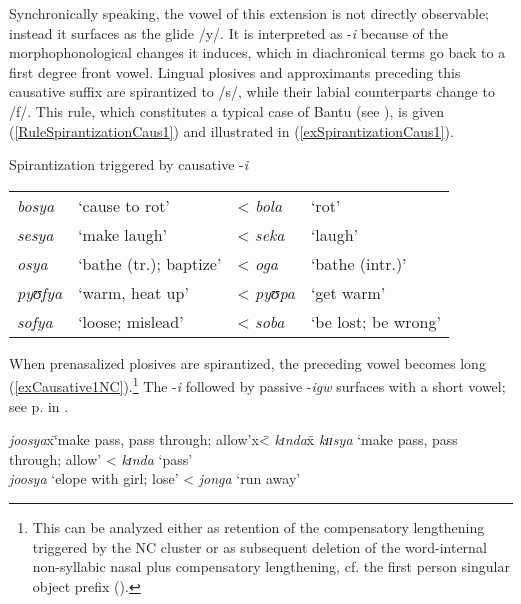 Synchronically speaking, the vowel of this extension is not directly observable; instead it surfaces as the glide /y/. It is interpreted as -\textit{i} because of the morphophonological changes it induces, which in diachronical terms go back to a first degree front vowel. Lingual plosives and approximants preceding this causative suffix are spirantized to /s/, while their labial counterparts change to /f/. This rule, which constitutes a typical case of Bantu  (see \citealt{BoestonK2008}), is given (\ref{RuleSpirantizationCaus1}) and illustrated in (\ref{exSpirantizationCaus1}).
\begin{exe}  
\ex Spirantization triggered by causative -\textit{i}\label{RuleSpirantizationCaus1}
\begin{xlist}
\ex {}
\ex {}
\end{xlist}
\ex\label{exSpirantizationCaus1} 
\begin{tabular}[t]{llll}
\textit{bosya}&`cause to rot'& < \textit{bola}&`rot'\\
\textit{sesya}&`make laugh'& < \textit{seka}&`laugh'\\
\textit{osya}&\lq bathe (tr.); baptize'& < \textit{oga}&`bathe (intr.)'\\
\textit{pyʊfya}&`warm, heat up'& < \textit{pyʊpa}&`get warm'\\
\textit{sofya}&`loose; mislead'& < \textit{soba}&`be lost; be wrong'
\end{tabular}
\end{exe}

\largerpage %
When prenasalized plosives are spirantized, the preceding vowel becomes long (\ref{exCausative1NC}).\footnote{This can be analyzed either as retention of the compensatory lengthening triggered by the NC cluster or as subsequent deletion of the word-internal non-syllabic nasal plus compensatory lengthening, cf. the first person singular object prefix ().} The  -\textit{i} followed by passive -\textit{igw} surfaces with a short vowel; see p.\nobreakspace\pageref{exCausativePassiveShortVowel} in .

\begin{exe}
\ex\label{exCausative1NC}
\begin{tabbing}
\textit{joosya}x\=\lq make pass, pass through; allow'x\= < \textit{kɪnda}x\=\kill %
\textit{kɪɪsya} \>\lq make pass, pass through; allow' \> < \textit{kɪnda} \> \lq pass'\\
\textit{joosya} \>`elope with girl; lose' \> < \textit{jonga} \> `run away'
\end{tabbing}
\end{exe}

